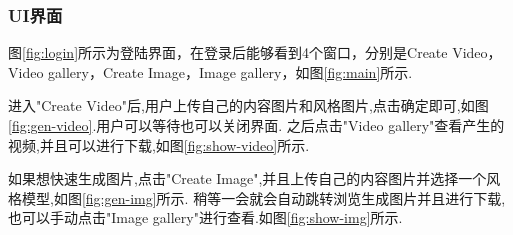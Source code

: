 \subsubsection{UI界面}\label{sec:ui}
图\ref{fig:login}所示为登陆界面，在登录后能够看到4个窗口，分别是Create Video，Video gallery，Create Image，Image gallery，如图\ref{fig:main}所示.

进入"Create Video"后,用户上传自己的内容图片和风格图片,点击确定即可,如图\ref{fig:gen-video}.用户可以等待也可以关闭界面.
之后点击"Video gallery"查看产生的视频,并且可以进行下载,如图\ref{fig:show-video}所示.

如果想快速生成图片,点击"Create Image",并且上传自己的内容图片并选择一个风格模型,如图\ref{fig:gen-img}所示.
稍等一会就会自动跳转浏览生成图片并且进行下载,也可以手动点击"Image gallery"进行查看.如图\ref{fig:show-img}所示.
